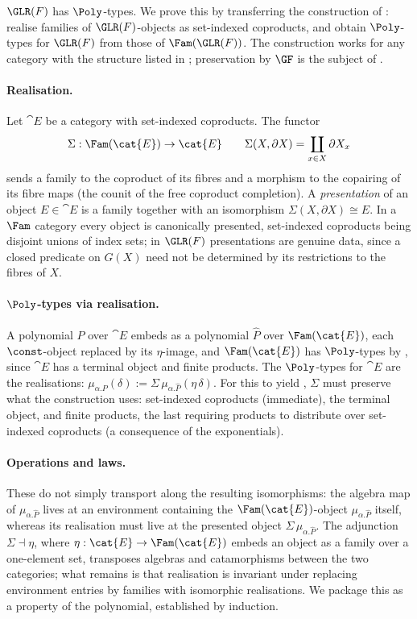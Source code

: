 $\GLR(F)$ has $\Poly$-types. We prove this by transferring the construction of
: realise families of $\GLR(F)$-objects as set-indexed coproducts, and
obtain $\Poly$-types for $\GLR(F)$ from those of $\Fam(\GLR(F))$. The construction works for
any category with the structure listed in ; preservation by $\GF$
is the subject of .

\paragraph{Realisation.}
Let $\cat{E}$ be a category with set-indexed coproducts. The functor
\[
  \Sigma : \Fam(\cat{E}) \to \cat{E} \qquad \Sigma(X, \partial X) = \coprod_{x \in X} \partial X_x
\]
sends a family to the coproduct of its fibres and a morphism to the copairing of its fibre maps (the
counit of the free coproduct completion). A \emph{presentation} of an object $E \in \cat{E}$ is a
family together with an isomorphism $\Sigma(X, \partial X) \cong E$. In a $\Fam$ category every
object is canonically presented, set-indexed coproducts being disjoint unions of index sets; in
$\GLR(F)$ presentations are genuine data, since a closed predicate on $G(X)$ need not be determined
by its restrictions to the fibres of $X$.

\paragraph{$\Poly$-types via realisation.}
A polynomial $P$ over $\cat{E}$ embeds as a polynomial $\hat{P}$ over $\Fam(\cat{E})$, each
$\const$-object replaced by its $\eta$-image, and $\Fam(\cat{E})$ has $\Poly$-types by
, since $\cat{E}$ has a terminal object and finite
products. The $\Poly$-types for $\cat{E}$ are the realisations: $\mu_{\alpha.P}(\delta) :=
\Sigma\, \mu_{\alpha.\hat{P}}(\eta\,\delta)$. For this to yield
, $\Sigma$ must preserve what the construction uses:
set-indexed coproducts (immediate), the terminal object, and finite products, the last requiring
products to distribute over set-indexed coproducts (a consequence of the exponentials).

\paragraph{Operations and laws.}
These do not simply transport along the resulting isomorphisms: the algebra map of
$\mu_{\alpha.\hat{P}}$ lives at an environment containing the $\Fam(\cat{E})$-object
$\mu_{\alpha.\hat{P}}$ itself, whereas its realisation must live at the presented object
$\Sigma\, \mu_{\alpha.\hat{P}}$. The adjunction $\Sigma \dashv \eta$, where $\eta : \cat{E}
\to \Fam(\cat{E})$ embeds an object as a family over a one-element set, transposes algebras and
catamorphisms between the two categories; what remains is that realisation is invariant under
replacing environment entries by families with isomorphic realisations. We package this as a
property of the polynomial, established by induction.

